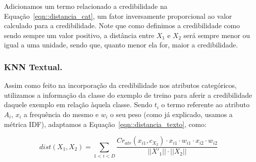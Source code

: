 Adicionamos um termo relacionado a credibilidade na Equação~\ref{eqn::distancia_cat}, um fator inversamente proporcional ao valor calculado para a credibilidade. Note que como definimos a credibilidade como sendo sempre um valor positivo, a distância entre $X_1$ e $X_2$ será sempre menor ou igual a uma unidade, sendo que, quanto menor ela for, maior a credibilidade.


\subsubsection{\textsc{KNN} Textual.}
\label{subsubsec::knntexto}

Assim como feito na incorporação da credibilidade nos atributos categóricos, utilizamos a informação da classe do exemplo de treino para aferir a credibilidade daquele exemplo em relação àquela classe. Sendo $t_i$ o termo referente ao atributo $A_i$, $x_i$ a frequência do mesmo e $w_i$ o seu peso (como já explicado, usamos a métrica \textsc{IDF}), adaptamos a Equação~\ref{eqn::distancia_texto}, como:

\begin{equation}\label{eqn::distancia_texto_cat}
    dist(X_1, X_2) = \sum\limits_{1 < i < D}\frac{  Cr_{atr}(x_{i1}, c_{X_2}) \cdot x_{i1} \cdot w_{i1} \cdot x_{i2} \cdot w_{i2} }{ ||X'_1|| \cdot ||X_2|| }
\end{equation}


